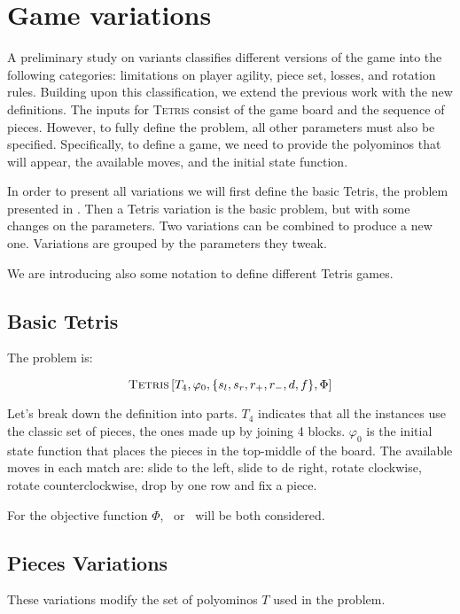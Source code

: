 \chapter{Game variations}

A preliminary study on variants classifies different versions of the game into the following categories: limitations on player agility, piece set, losses, and rotation rules\cite{TIH}. Building upon this classification, we extend the previous work with the new definitions. The inputs for \textsc{Tetris} consist of the game board and the sequence of pieces. However, to fully define the problem, all other parameters must also be specified. Specifically, to define a game, we need to provide the polyominos that will appear, the available moves, and the initial state function.

In order to present all variations we will first define the basic Tetris, the problem presented in \cite{TIH}. Then a Tetris variation is the basic problem, but with some changes on the parameters. Two variations can be combined to produce a new one. Variations are grouped by the parameters they tweak.

We are introducing also some notation to define different Tetris games. 

\section{Basic Tetris}

The problem is:

$$\textsc{Tetris}\left[T_4,\varphi_0, \{s_l,s_r, r_+, r_-, d, f \},\Phi \right]$$

Let's break down the definition into parts. $T_4$ indicates that all the instances use the classic set of pieces, the ones made up by joining 4 blocks. $\varphi_0$ is the initial state function that places the pieces in the top-middle of the board. The available moves in each match are: slide to the left, slide to de right, rotate clockwise, rotate counterclockwise, drop by one row and fix a piece. 

For the objective function $\Phi$, \clearing\ or \survival\ will be both considered.


\section{Pieces Variations}

These variations modify the set of polyominos \( T \) used in the problem.

